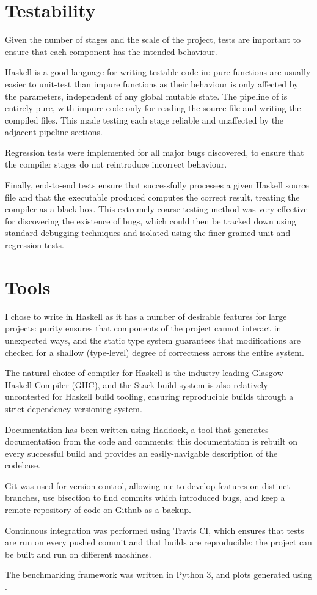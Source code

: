 \documentclass[dissertation.tex]{subfiles}
\begin{document}
\section{Testability}
{
    Given the number of stages and the scale of the project, tests are important to ensure that each component has the intended behaviour.
    
    Haskell is a good language for writing testable code in: pure functions are usually easier to unit-test than impure functions as their behaviour is only affected by the parameters, independent of any global mutable state. The pipeline of \compilername is entirely pure, with impure code only for reading the source file and writing the compiled files. This made testing each stage reliable and unaffected by the adjacent pipeline sections.

    Regression tests were implemented for all major bugs discovered, to ensure that the compiler stages do not reintroduce incorrect behaviour. 

    Finally, end-to-end tests ensure that \compilername successfully processes a given Haskell source file and that the executable produced computes the correct result, treating the compiler as a black box. This extremely coarse testing method was very effective for discovering the existence of bugs, which could then be tracked down using standard debugging techniques and isolated using the finer-grained unit and regression tests. 
}
\section{Tools}
{
    I chose to write \compilername in Haskell as it has a number of desirable features for large projects: purity ensures that components of the project cannot interact in unexpected ways, and the static type system guarantees that modifications are checked for a shallow (type-level) degree of correctness across the entire system.

    The natural choice of compiler for Haskell is the industry-leading Glasgow Haskell Compiler (GHC), and the Stack build system is also relatively uncontested for Haskell build tooling, ensuring reproducible builds through a strict dependency versioning system.

    Documentation has been written using Haddock, a tool that generates documentation from the code and comments: this documentation is rebuilt on every successful build and provides an easily-navigable description of the codebase.

    Git was used for version control, allowing me to develop features on distinct branches, use bisection to find commits which introduced bugs, and keep a remote repository of code on Github as a backup. 

    Continuous integration was performed using Travis CI, which ensures that tests are run on every pushed commit and that builds are reproducible: the project can be built and run on different machines.

    The benchmarking framework was written in Python 3, and plots generated using .
}
\end{document}

